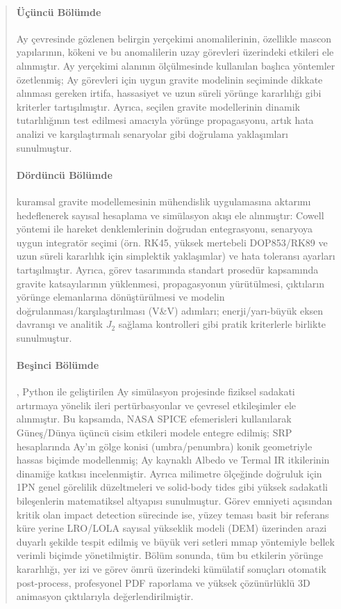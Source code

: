 \documentclass[12pt, a4paper]{book}
\begin{document}
\begin{abstract}
\paragraph{Üçüncü Bölümde} Ay çevresinde gözlenen belirgin yerçekimi anomalilerinin, özellikle
mascon yapılarının, kökeni ve bu anomalilerin uzay görevleri üzerindeki etkileri ele alınmıştır.
Ay yerçekimi alanının ölçülmesinde kullanılan başlıca yöntemler özetlenmiş; Ay görevleri için
uygun gravite modelinin seçiminde dikkate alınması gereken irtifa, hassasiyet ve uzun süreli
yörünge kararlılığı gibi kriterler tartışılmıştır. Ayrıca, seçilen gravite modellerinin dinamik
tutarlılığının test edilmesi amacıyla yörünge propagasyonu, artık hata analizi ve karşılaştırmalı
senaryolar gibi doğrulama yaklaşımları sunulmuştur.

\paragraph{Dördüncü Bölümde} kuramsal gravite modellemesinin mühendislik uygulamasına
aktarımı hedeflenerek sayısal hesaplama ve simülasyon akışı ele alınmıştır: Cowell yöntemi ile
hareket denklemlerinin doğrudan entegrasyonu, senaryoya uygun integratör seçimi (örn. RK45,
yüksek mertebeli DOP853/RK89 ve uzun süreli kararlılık için simplektik yaklaşımlar) ve hata
toleransı ayarları tartışılmıştır. Ayrıca, görev tasarımında standart prosedür kapsamında gravite katsayılarının yüklenmesi, propagasyonun yürütülmesi, çıktıların
yörünge elemanlarına dönüştürülmesi ve modelin doğrulanması/karşılaştırılması (V\&V) adımları; enerji/yarı-büyük eksen davranışı ve analitik $J_2$ sağlama kontrolleri gibi pratik
kriterlerle birlikte sunulmuştur.

\paragraph{Beşinci Bölümde}, Python ile geliştirilen Ay simülasyon projesinde 
fiziksel sadakati artırmaya yönelik ileri pertürbasyonlar ve çevresel etkileşimler 
ele alınmıştır. Bu kapsamda, NASA SPICE efemerisleri kullanılarak Güneş/Dünya üçüncü 
cisim etkileri modele entegre edilmiş; SRP hesaplarında Ay’ın gölge konisi (umbra/penumbra) 
konik geometriyle hassas biçimde modellenmiş; Ay kaynaklı Albedo ve Termal IR itkilerinin 
dinamiğe katkısı incelenmiştir. Ayrıca milimetre ölçeğinde doğruluk için 1PN genel görelilik 
düzeltmeleri ve solid-body tides gibi yüksek sadakatli bileşenlerin matematiksel altyapısı sunulmuştur. 
Görev emniyeti açısından kritik olan impact detection sürecinde ise, yüzey teması basit bir referans küre 
yerine LRO/LOLA sayısal yükseklik modeli (DEM) üzerinden arazi duyarlı şekilde tespit edilmiş ve büyük veri 
setleri mmap yöntemiyle bellek verimli biçimde yönetilmiştir. Bölüm sonunda, tüm bu etkilerin yörünge 
kararlılığı, yer izi ve görev ömrü üzerindeki kümülatif sonuçları otomatik post-process, profesyonel PDF 
raporlama ve yüksek çözünürlüklü 3D animasyon çıktılarıyla değerlendirilmiştir.


\end{abstract}
\end{document}
